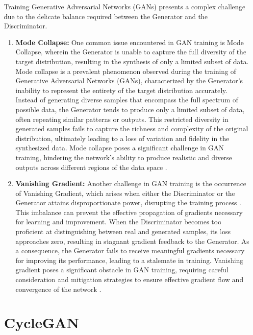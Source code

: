 \documentclass[UKenglish,12pt]{master-style}
\begin{document}
Training Generative Adversarial Networks (GANs) presents a complex challenge due to the delicate balance required between the Generator and the Discriminator. 
\begin{enumerate}
    
\item \textbf{{Mode Collapse:}} One common issue encountered in GAN training is Mode Collapse, wherein the Generator is unable to capture the full diversity of the target distribution, resulting in the synthesis of only a limited subset of data. Mode collapse is a prevalent phenomenon observed during the training of Generative Adversarial Networks (GANs), characterized by the Generator's inability to represent the entirety of the target distribution accurately. Instead of generating diverse samples that encompass the full spectrum of possible data, the Generator tends to produce only a limited subset of data, often repeating similar patterns or outputs. This restricted diversity in generated samples fails to capture the richness and complexity of the original distribution, ultimately leading to a loss of variation and fidelity in the synthesized data. Mode collapse poses a significant challenge in GAN training, hindering the network's ability to produce realistic and diverse outputs across different regions of the data space \cite{Kundu_2019_ICCV} .

\item \textbf{{Vanishing Gradient:}} Another challenge in GAN training is the occurrence of Vanishing Gradient, which arises when either the Discriminator or the Generator attains disproportionate power, disrupting the training process \cite{Kundu_2019_ICCV} . This imbalance can prevent the effective propagation of gradients necessary for learning and improvement. When the Discriminator becomes too proficient at distinguishing between real and generated samples, its loss approaches zero, resulting in stagnant gradient feedback to the Generator. As a consequence, the Generator fails to receive meaningful gradients necessary for improving its performance, leading to a stalemate in training. Vanishing gradient poses a significant obstacle in GAN training, requiring careful consideration and mitigation strategies to ensure effective gradient flow and convergence of the network \cite{Kundu_2019_ICCV} .
\end{enumerate}
\section{CycleGAN}
\end{document}
